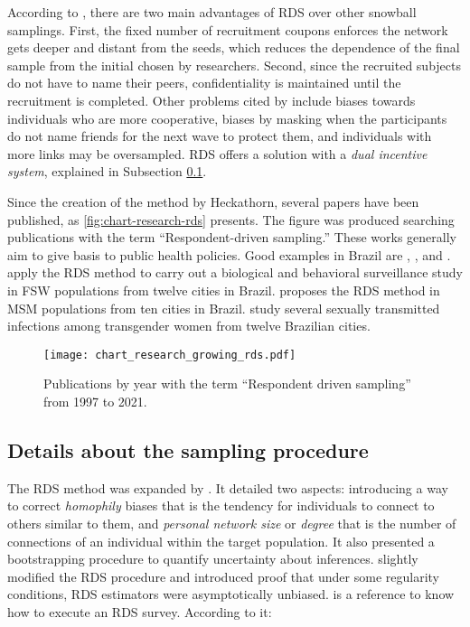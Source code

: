 According to \textcite[p. 66]{gile2018methods}, there are two main advantages
of RDS over other snowball samplings. First, the fixed number of recruitment
coupons enforces the network gets deeper and distant from the seeds, which
reduces the dependence of the final sample from the initial chosen by
researchers. Second, since the recruited subjects do not have to name their
peers, confidentiality is maintained until the recruitment is completed.
Other problems cited by \textcite[p. 175]{heckathorn1997} include biases
towards individuals who are more cooperative, biases by masking when the
participants do not name friends for the next wave to protect them, and
individuals with more links may be oversampled. RDS offers a solution with a
{\em dual incentive system}, explained in Subsection
\ref{sec:sampling-procedure}. 

Since the creation of the method by Heckathorn, several papers have been
published, as \autoref{fig:chart-research-rds} presents. The figure was produced searching
publications with the term ``Respondent-driven sampling.'' These works generally
aim to give basis to public health policies. Good examples in Brazil are
\textcite{damacena2019application}, \textcite{mota2012respondent}, and
\textcite{bastos2018hiv}. \textcite{damacena2019application} apply the RDS method
to carry out a biological and behavioral surveillance study in FSW populations from twelve cities
in Brazil. \textcite{mota2012respondent} proposes the RDS method in MSM populations from ten cities in
Brazil. \textcite{bastos2018hiv} study several sexually transmitted infections among
transgender women from twelve Brazilian cities.  

\begin{figure}
  \centering  
  \caption{\label{fig:chart-research-rds}Publications by year with the term
  ``Respondent driven sampling'' from 1997 to 2021.}
  \texttt{[image: chart\_research\_growing\_rds.pdf]}
\end{figure}

\subsection{Details about the sampling procedure}
\label{sec:sampling-procedure}

The RDS method was expanded by \textcite{heckathorn2002}. It detailed two aspects: 
introducing a way to correct {\em homophily} biases that is the tendency for
individuals to connect to others similar to them, and {\em personal network size} or
{\em degree} that is the number of connections of an individual within the
target population. It also presented a bootstrapping procedure to quantify
uncertainty about inferences. \textcite{salganik2004sampling} slightly modified the
RDS procedure and introduced proof that under some regularity conditions, RDS
estimators were asymptotically unbiased. \textcite{world2013introduction}
is a reference to know how to execute an RDS survey. According to it: 

